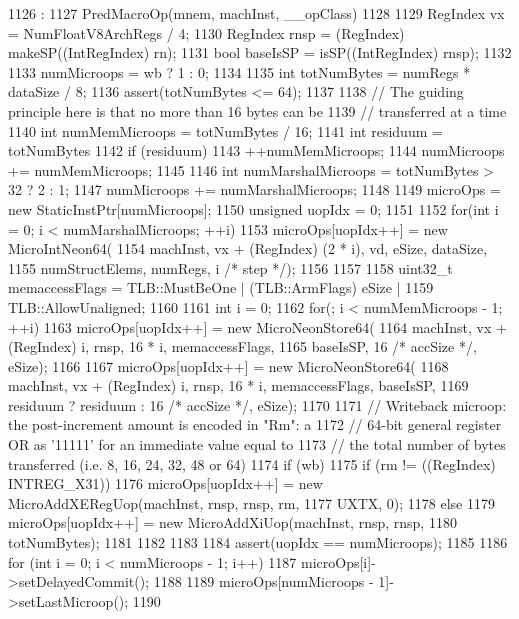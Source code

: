 \begin{DoxyCode}
1126                                                                            :
1127     PredMacroOp(mnem, machInst, __opClass)
1128 {
1129     RegIndex vx = NumFloatV8ArchRegs / 4;
1130     RegIndex rnsp = (RegIndex) makeSP((IntRegIndex) rn);
1131     bool baseIsSP = isSP((IntRegIndex) rnsp);
1132 
1133     numMicroops = wb ? 1 : 0;
1134 
1135     int totNumBytes = numRegs * dataSize / 8;
1136     assert(totNumBytes <= 64);
1137 
1138     // The guiding principle here is that no more than 16 bytes can be
1139     // transferred at a time
1140     int numMemMicroops = totNumBytes / 16;
1141     int residuum = totNumBytes %
1142     if (residuum)
1143         ++numMemMicroops;
1144     numMicroops += numMemMicroops;
1145 
1146     int numMarshalMicroops = totNumBytes > 32 ? 2 : 1;
1147     numMicroops += numMarshalMicroops;
1148 
1149     microOps = new StaticInstPtr[numMicroops];
1150     unsigned uopIdx = 0;
1151 
1152     for(int i = 0; i < numMarshalMicroops; ++i) {
1153         microOps[uopIdx++] = new MicroIntNeon64(
1154             machInst, vx + (RegIndex) (2 * i), vd, eSize, dataSize,
1155             numStructElems, numRegs, i /* step */);
1156     }
1157 
1158     uint32_t memaccessFlags = TLB::MustBeOne | (TLB::ArmFlags) eSize |
1159         TLB::AllowUnaligned;
1160 
1161     int i = 0;
1162     for(; i < numMemMicroops - 1; ++i) {
1163         microOps[uopIdx++] = new MicroNeonStore64(
1164             machInst, vx + (RegIndex) i, rnsp, 16 * i, memaccessFlags,
1165             baseIsSP, 16 /* accSize */, eSize);
1166     }
1167     microOps[uopIdx++] = new MicroNeonStore64(
1168         machInst, vx + (RegIndex) i, rnsp, 16 * i, memaccessFlags, baseIsSP,
1169         residuum ? residuum : 16 /* accSize */, eSize);
1170 
1171     // Writeback microop: the post-increment amount is encoded in "Rm": a
1172     // 64-bit general register OR as '11111' for an immediate value equal to
1173     // the total number of bytes transferred (i.e. 8, 16, 24, 32, 48 or 64)
1174     if (wb) {
1175         if (rm != ((RegIndex) INTREG_X31)) {
1176             microOps[uopIdx++] = new MicroAddXERegUop(machInst, rnsp, rnsp, rm,
1177                                                       UXTX, 0);
1178         } else {
1179             microOps[uopIdx++] = new MicroAddXiUop(machInst, rnsp, rnsp,
1180                                                    totNumBytes);
1181         }
1182     }
1183 
1184     assert(uopIdx == numMicroops);
1185 
1186     for (int i = 0; i < numMicroops - 1; i++) {
1187         microOps[i]->setDelayedCommit();
1188     }
1189     microOps[numMicroops - 1]->setLastMicroop();
1190 }

\end{DoxyCode}


